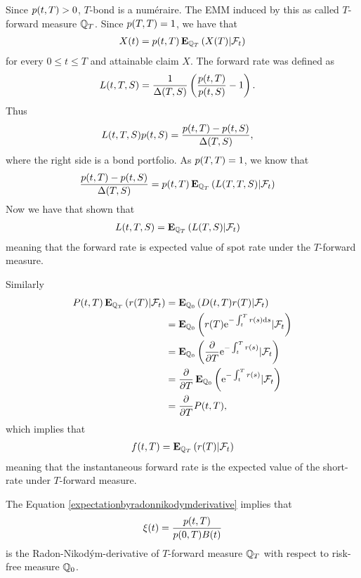 Since $p(t,T) > 0$, $T$-bond is a num\'{e}raire. The EMM induced by this as called $T$-forward measure $\mathbb{Q}_T$. Since $p(T,T) = 1$, we have that
\begin{align}
X(t) = p(t,T) \operatorname{\boldsymbol{\mathrm{E}}}_{\mathbb{Q}_T} \left( X(T) | \mathcal{F}_t \right)
\end{align}
for every $0 \leq t \leq T$ and attainable claim $X$. The forward rate was defined as
\begin{align}
L(t,T,S) &= \frac{1}{\Delta(T,S)} \left( \frac{p(t,T)}{p(t,S)} - 1 \right) .
\end{align}
Thus
\begin{align}
L(t,T,S) p(t,S)  &= \frac{p(t,T)-p(t,S)}{\Delta(T,S)}  ,
\end{align}
where the right side is a bond portfolio. As $p(T,T) = 1$, we know that 
\begin{align}
\frac{p(t,T)-p(t,S)}{\Delta(T,S)} &= p(t,T) \operatorname{\boldsymbol{\mathrm{E}}}_{\mathbb{Q}_T} \left( L(T,T,S) | \mathcal{F}_t \right) 
\end{align}
Now we have that shown that
\begin{align}
L(t,T,S) &= \operatorname{\boldsymbol{\mathrm{E}}}_{\mathbb{Q}_T} \left( L(T,S) | \mathcal{F}_t \right) 
\end{align}
meaning that the forward rate is expected value of spot rate under the $T$-forward measure.	

Similarly
\begin{align}
P(t,T) \operatorname{\boldsymbol{\mathrm{E}}}_{\mathbb{Q}_T} \left( r(T) | \mathcal{F}_t \right) &= \operatorname{\boldsymbol{\mathrm{E}}}_{\mathbb{Q}_0} \left( D(t,T) r(T) | \mathcal{F}_t \right) \\
&= \operatorname{\boldsymbol{\mathrm{E}}}_{\mathbb{Q}_0} \left( r(T) \mathrm{e}^{-\int_t^T r(s) \mathrm{d} s} | \mathcal{F}_t \right) \\
&= \operatorname{\boldsymbol{\mathrm{E}}}_{\mathbb{Q}_0} \left( \frac{\partial}{\partial T} \mathrm{e}^{-\int_t^T r(s)} | \mathcal{F}_t \right) \\
&= \frac{\partial}{\partial T} \operatorname{\boldsymbol{\mathrm{E}}}_{\mathbb{Q}_0} \left( \mathrm{e}^{-\int_t^T r(s)} | \mathcal{F}_t \right) \\
&= \frac{\partial}{\partial T} P(t,T) ,
\end{align}
which implies that
\begin{align}
f(t,T) = \operatorname{\boldsymbol{\mathrm{E}}}_{\mathbb{Q}_T} \left( r(T) | \mathcal{F}_t \right) 
\end{align}
meaning that the instantaneous forward rate is the expected value of the short-rate under $T$-forward measure. 

The Equation \ref{expectationbyradonnikodymderivative} implies that  
\begin{align}
\xi (t) = \frac{p(t,T)}{p(0,T) B(t)}
\end{align}
is the Radon-Nikod\'{y}m-derivative of $T$-forward measure $\mathbb{Q}_T$ with respect to risk-free measure $\mathbb{Q}_0$.


